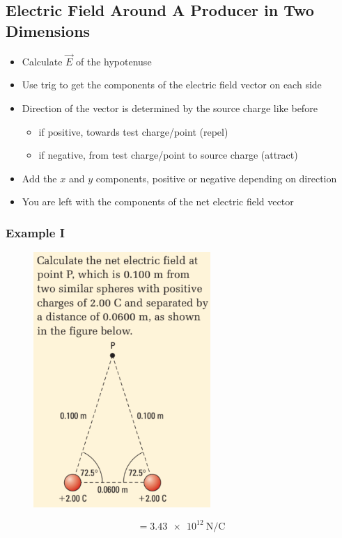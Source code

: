 \documentclass[a4paper,12pt]{article}
\begin{document}
\subsection{Electric Field Around A Producer in Two Dimensions}
\begin{itemize}
    \item{Calculate $\vec{E}$ of the hypotenuse}
    \item{Use trig to get the components of the electric field vector on each side}
\item{
    Direction of the vector is determined by the source charge like before
        \begin{itemize}
            \item{if positive, towards test charge/point (repel)}
            \item{if negative, from test charge/point to source charge (attract)}
        \end{itemize}
    }
    \item{Add the $x$ and $y$ components, positive or negative depending on direction}
    \item{You are left with the components of the net electric field vector}
\end{itemize}

\subsubsection{Example I}
\begin{figure}[H]
    \centering
    \includegraphics[width=0.6\textwidth]{fieldtriangle}
\end{figure}
$$= \SI{3.43e12}{\newton\per\coulomb}$$
\end{document}
